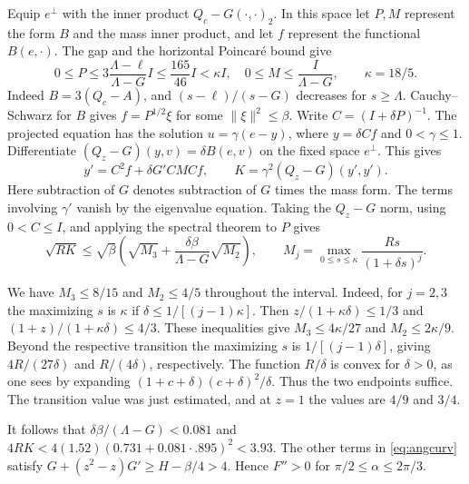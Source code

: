\documentclass[11pt,a4paper,reqno]{amsart}
\theoremstyle{remark}
\numberwithin{equation}{section}
\begin{document}
Equip $e^\perp$ with the inner product $Q_c-G(\cdot,\cdot)_2$. In this
space let $P,M$ represent the form $B$ and the mass inner product, and let
$f$ represent the functional $B(e,\cdot)$. The gap and the horizontal
Poincar\'e bound give
\[
  0\le P\le3\frac{\Lambda-\ell}{\Lambda-G}I
        \le\frac{165}{46}I<\kappa I,\quad
  0\le M\le\frac I{\Lambda-G},\qquad \kappa=18/5 .
\]
Indeed $B=3(Q_c-A)$, and $(s-\ell)/(s-G)$ decreases for $s\ge\Lambda$.
Cauchy--Schwarz for $B$ gives $f=P^{1/2}\xi$ for some $\|\xi\|^2\le\beta$.
Write $C=(I+\delta P)^{-1}$. The projected equation has the solution
$u=\gamma(e-y)$, where $y=\delta Cf$ and $0<\gamma\le1$.
Differentiate $(Q_z-G)(y,v)=\delta B(e,v)$ on the fixed space $e^\perp$.
This gives
\[
 y'=C^2f+\delta G'CMC f,\qquad K=\gamma^2(Q_z-G)(y',y').
\]
Here subtraction of $G$ denotes subtraction of $G$ times the mass form.
The terms involving $\gamma'$ vanish by the eigenvalue equation. Taking the
$Q_z-G$ norm, using $0<C\le I$, and applying the spectral theorem to $P$
gives
\begin{equation}\label{eq:rbound}
 \sqrt{RK}\le\sqrt\beta
 \left(\sqrt{M_3}+\frac{\delta\beta}{\Lambda-G}\sqrt{M_2}\right),\qquad
 M_j=\max_{0\le s\le\kappa}\frac{R s}{(1+\delta s)^j}.
\end{equation}

We have $M_3\le8/15$ and $M_2\le4/5$ throughout the interval. Indeed, for
$j=2,3$ the maximizing $s$ is $\kappa$ if $\delta\le1/[(j-1)\kappa]$.
Then $z/(1+\kappa\delta)\le1/3$ and
$(1+z)/(1+\kappa\delta)\le4/3$. These inequalities give
$M_3\le4\kappa/27$ and $M_2\le2\kappa/9$. Beyond the respective transition
the maximizing $s$ is $1/[(j-1)\delta]$, giving $4R/(27\delta)$ and
$R/(4\delta)$, respectively. The function $R/\delta$ is convex for
$\delta>0$, as one sees by expanding $(1+c+\delta)(c+\delta)^2/\delta$.
Thus the two endpoints suffice. The transition value was just estimated,
and at $z=1$ the values are $4/9$ and $3/4$.

It follows that $\delta\beta/(\Lambda-G)<0.081$ and
$4RK<4(1.52)(0.731+0.081\cdot.895)^2<3.93$. The other terms in
\eqref{eq:angcurv} satisfy $G+(z^2-z)G'\ge H-\beta/4>4$.
Hence $F''>0$ for $\pi/2\le\alpha\le2\pi/3$.
\end{document}
